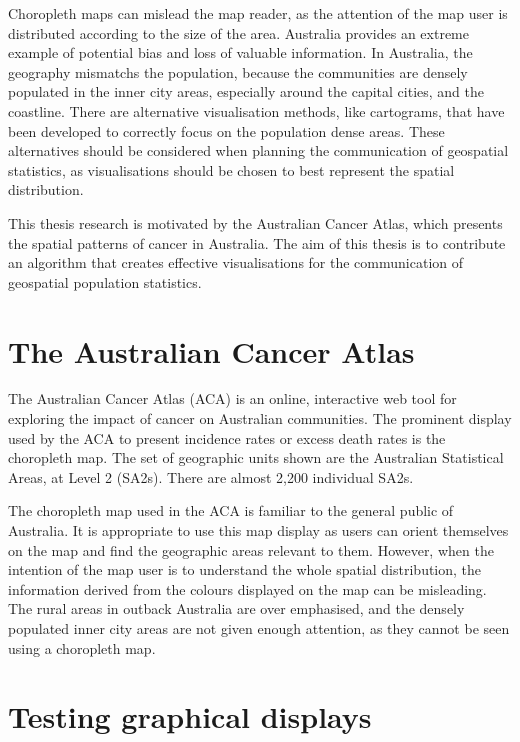 \documentclass{monashthesis}
\begin{document}
Choropleth maps can mislead the map reader, as the attention of the map user is distributed according to the size of the area. Australia provides an extreme example of potential bias and loss of valuable information. In Australia, the geography mismatchs the population, because the communities are densely populated in the inner city areas, especially around the capital cities, and the coastline. There are alternative visualisation methods, like cartograms, that have been developed to correctly focus on the population dense areas. These alternatives should be considered when planning the communication of geospatial statistics, as visualisations should be chosen to best represent the spatial distribution.

This thesis research is motivated by the Australian Cancer Atlas, which presents the spatial patterns of cancer in Australia. The aim of this thesis is to contribute an algorithm that creates effective visualisations for the communication of geospatial population statistics.

\hypertarget{the-australian-cancer-atlas}{%
\section{The Australian Cancer Atlas}\label{the-australian-cancer-atlas}}

The Australian Cancer Atlas (ACA) is an online, interactive web tool for exploring the impact of cancer on Australian communities. The prominent display used by the ACA to present incidence rates or excess death rates is the choropleth map. The set of geographic units shown are the Australian Statistical Areas, at Level 2 (SA2s). There are almost 2,200 individual SA2s.

The choropleth map used in the ACA is familiar to the general public of Australia. It is appropriate to use this map display as users can orient themselves on the map and find the geographic areas relevant to them.
However, when the intention of the map user is to understand the whole spatial distribution, the information derived from the colours displayed on the map can be misleading.
The rural areas in outback Australia are over emphasised, and the densely populated inner city areas are not given enough attention, as they cannot be seen using a choropleth map.

\hypertarget{testing-graphical-displays}{%
\section{Testing graphical displays}\label{testing-graphical-displays}}
\end{document}
